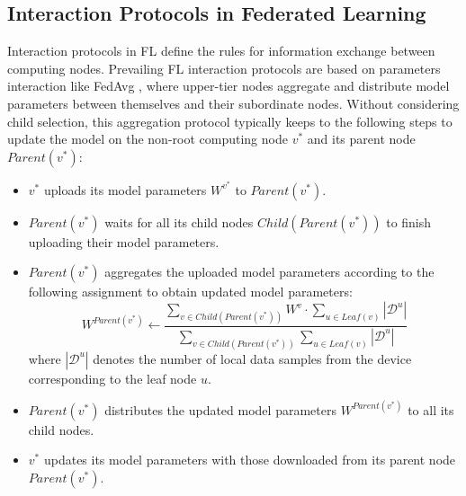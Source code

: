 \documentclass[10pt,journal]{IEEEtran}
\let\oldsum\sum
\renewcommand{\sum}{\displaystyle\oldsum}
\begin{document}
\subsection{Interaction Protocols in Federated Learning}
Interaction protocols in FL define the rules for information exchange between computing nodes.
Prevailing FL interaction protocols are based on parameters interaction like FedAvg \cite{mcmahan2017communication}, where upper-tier nodes aggregate and distribute model parameters between themselves and their subordinate nodes.
Without considering child selection, this aggregation protocol typically keeps to the following steps to update the model on the non-root computing node $v^{*}$ and its parent node $Parent(v^*)$:
	\begin{itemize}
		\item $v^{*}$ uploads its model parameters $W^{v^{*}}$ to $Parent(v^*)$.
		\item $Parent(v^*)$ waits for all its child nodes $Child(Parent(v^*))$ to finish uploading their model parameters.
		\item $Parent(v^*)$ aggregates the uploaded model parameters according to the following assignment to obtain updated model parameters:
		\begin{equation}
			{W^{Parent({v^*})}} \leftarrow \frac{{\sum\limits_{v \in Child(Parent({v^*}))} {{W^v} \cdot \sum\limits_{u \in Leaf(v)} {|{\mathcal{D}^u}|} } }}{{\sum\limits_{v \in Child(Parent({v^*}))} {\sum\limits_{u \in Leaf(v)} {|{\mathcal{D}^u}|} } }}
		\end{equation}
		where ${|{\mathcal{D}^u}|}$ denotes the number of local data samples from the device corresponding to the leaf node $u$.
		\item $Parent(v^*)$ distributes the updated model parameters ${W^{Parent({v^*})}}$ to all its child nodes.
		\item $v^{*}$ updates its model parameters with those downloaded from its parent node $Parent(v^*)$.
	\end{itemize}


    
    
\end{document}
